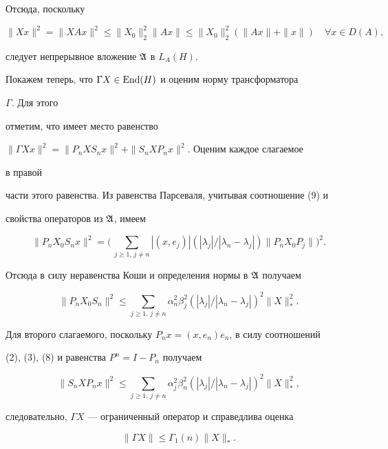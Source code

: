 Отсюда, поскольку


$$


\|Xx\|^2=\|XAx\|^2 \le \|X_0\|^2_2\|Ax\| \le


\|X_0\|^2_2(\|Ax\|+\|x\|)\quad \forall x\in D(A),


$$


следует непрерывное вложение $\frak A$ в $L_A(H)$.





Покажем теперь, что $\Gamma X\in\operatorname{End}(H)$ и оценим норму трансформатора


$\Gamma$. Для этого


отметим, что имеет место равенство


$\|\Gamma Xx\|^2=\|P_nXS_nx\|^2+\|S_nXP_nx\|^2$. Оценим каждое слагаемое


в правой


части этого равенства. Из равенства Парсеваля, учитывая соотношение (9) и


свойства операторов из $\frak A$, имеем


$$


\|P_nX_0S_nx\|^2=\biggl(\,


\sum_{j\ge 1,\,j\ne n}|(x,e_j)|(|\lambda_j|/|\lambda_n-\lambda_j|)


\|P_nX_0P_j\|\biggr)^2.


$$


Отсюда в силу неравенства Коши и определения нормы в $\frak A$ получаем


$$


\|P_nX_0S_n\|^2\le


\sum_{j\ge 1,\,j\ne n}\alpha^2_n\beta^2_j


(|\lambda_j|/|\lambda_n-\lambda_j|)^2\|X\|^2_*.


$$


Для второго слагаемого, поскольку $P_nx=(x,e_n)e_n$, в силу соотношений


(2), (3), (8) и равенства $P^n=I-P_n$ получаем


$$


\|S_nXP_nx\|^2 \le \sum_{j\ge 1,\,j\ne n}\alpha^2_j\beta^2_n


(|\lambda_j|/|\lambda_n-\lambda_j|)^2\|X\|^2_*,


$$


следовательно, $\Gamma X$ --- ограниченный оператор и справедлива оценка


\begin{equation}


\|\Gamma X\|\le \Gamma_1(n)\|X\|_*.


\end{equation}


